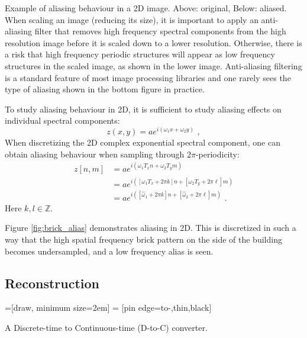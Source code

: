 \begin{marginfigure}
\begin{center}
\end{center}
\caption{Example of aliasing behaviour in a 2D image. Above: original, Below: aliased. When scaling an image (reducing its size), it is important to apply an anti-aliasing filter that removes high frequency spectral components from the high resolution image before it is scaled down to a lower resolution. Otherwise, there is a risk that high frequency periodic structures will appear as low frequency structures in the scaled image, as shown in the lower image. Anti-aliasing filtering is a standard feature of most image processing libraries and one rarely sees the type of aliasing shown in the bottom figure in practice.}
\label{fig:brick_alias}
\end{marginfigure}
To study aliasing behaviour in 2D, it is sufficient to study aliasing effects on individual spectral components:
\begin{equation}
z(x,y) = a e^{i (\omega_1 x + \omega_2 y) }\,\,,
\end{equation}
When discretizing the 2D complex exponential spectral component, one can obtain aliasing behaviour when sampling through $2\pi$-periodicity:
\begin{align}
z[n,m] &= a e^{i(\omega_1 T_x n + \omega_2 T_y m ) }\\
      &=a e^{i([\omega_1 T_x + 2\pi k]n + [\omega_2 T_y + 2\pi \ell]m)} \\
      &=a e^{i([\hat{\omega}_1 + 2\pi k]n + [\hat{\omega}_{2} + 2\pi \ell]m)}\,\,.
\end{align}
Here $k,l \in \mathbb{Z}$. 

Figure \ref{fig:brick_alias} demonstrates aliasing in 2D. This is
discretized in such a way that the high spatial frequency brick
pattern on the side of the building becomes undersampled, and a low
frequency alias is seen.


\subsection{Reconstruction}
\begin{marginfigure}
=[draw, minimum size=2em]
 = [pin edge={to-,thin,black}]
\begin{center}
\end{center}
\caption{A Discrete-time to Continuous-time (D-to-C) converter.}
\end{marginfigure}

